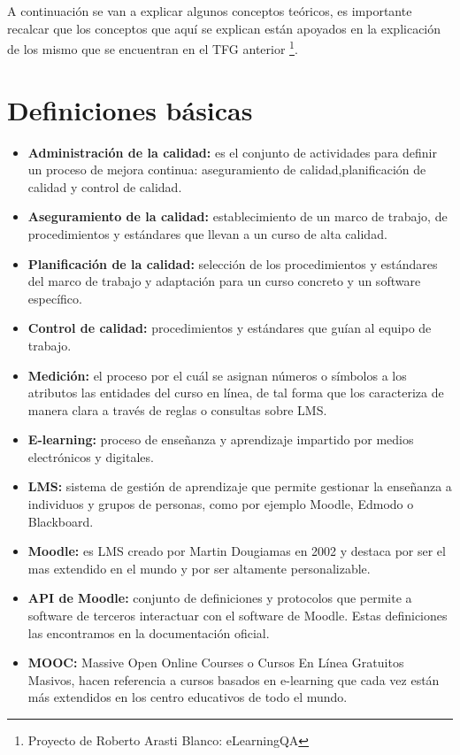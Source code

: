 
A continuación se van a explicar algunos conceptos teóricos, es importante recalcar que los conceptos que aquí se explican están apoyados en la explicación de los mismo que se encuentran en el TFG anterior \footnote{Proyecto de Roberto Arasti Blanco: eLearningQA\label{tfg-RobertoArasto}}.

\section{Definiciones básicas}
\begin{itemize}
	\item \textbf{Administración de la calidad:} es el conjunto de actividades para definir un proceso de mejora continua: aseguramiento de calidad,planificación de calidad y control de calidad.
	\item \textbf{Aseguramiento de la calidad:} establecimiento de un marco de trabajo, de procedimientos y estándares que llevan a un curso de alta calidad.
    \item \textbf{Planificación de la calidad:} selección de los procedimientos y estándares del marco de trabajo y adaptación para un curso concreto y un software específico.
    \item \textbf{Control de calidad:} procedimientos y estándares que guían al equipo de trabajo.
    \item \textbf{Medición:} el proceso por el cuál se asignan números o símbolos a los atributos las entidades del curso en línea, de tal forma que los caracteriza de manera clara a través de reglas o consultas sobre LMS.
    \item \textbf{E-learning:} proceso de enseñanza y aprendizaje impartido por medios electrónicos y digitales.
    \item \textbf{LMS:} sistema de gestión de aprendizaje que permite gestionar la enseñanza a individuos y grupos de personas, como por ejemplo Moodle, Edmodo o Blackboard.
    \item \textbf{Moodle:} es LMS creado por Martin Dougiamas en 2002 y destaca por ser el mas extendido en el mundo y por ser altamente personalizable.
    \item \textbf{API de Moodle:} conjunto de definiciones y protocolos que permite a software de terceros interactuar con el software de Moodle. Estas definiciones las encontramos en la documentación oficial\cite{moodle-api}.
    \item \textbf{MOOC:} Massive Open Online Courses o Cursos En Línea Gratuitos Masivos, hacen referencia a cursos basados en e-learning que cada vez están más extendidos en los centro educativos de todo el mundo.

\end{itemize}
